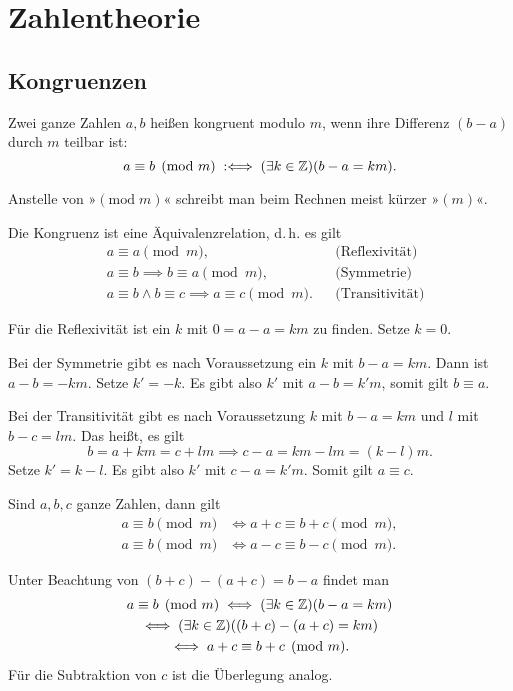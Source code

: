 
\chapter{Zahlentheorie}

\section{Kongruenzen}

\begin{Definition}[Kongruenz]
Zwei ganze Zahlen $a,b$ heißen kongruent modulo $m$, wenn ihre Differenz
$(b-a)$ durch $m$ teilbar ist:%
\[a\equiv b\pmod{m}\;:\Longleftrightarrow\; (\exists k\in\mathbb Z)(b-a=km).\]
\end{Definition}
Anstelle von »$(\mathrm{mod}\;m)$« schreibt man beim Rechnen meist
kürzer »$(m)$«.

\begin{Satz}
Die Kongruenz ist eine Äquivalenzrelation, d.\,h. es gilt
\begin{align*}
&a\equiv a\pmod{m},&&\text{(Reflexivität)}\\
&a\equiv b\implies b\equiv a\pmod{m},&&\text{(Symmetrie)}\\
&a\equiv b\land b\equiv c\implies a\equiv c\pmod{m}.&&\text{(Transitivität)}
\end{align*}
\end{Satz}
 Für die Reflexivität ist ein $k$ mit $0=a-a=km$
zu finden. Setze $k=0$.

Bei der Symmetrie gibt es nach Voraussetzung
ein $k$ mit $b-a=km$. Dann ist $a-b=-km$. Setze $k'=-k$.
Es gibt also $k'$ mit $a-b=k'm$, somit gilt $b\equiv a$.

Bei der Transitivität gibt es nach Voraussetzung $k$ mit
$b-a=km$ und $l$ mit $b-c=lm$. Das heißt, es gilt
\[b = a+km = c+lm\implies c-a = km-lm = (k-l)m.\]
Setze $k'=k-l$. Es gibt also $k'$ mit $c-a=k'm$.
Somit gilt $a\equiv c$.\;\qedsymbol

\begin{Satz}\label{Kongruenz-add-sub}
Sind $a,b,c$ ganze Zahlen, dann gilt
\begin{align*}
a\equiv b\pmod{m}&\iff a+c\equiv b+c\pmod{m},\\
a\equiv b\pmod{m}&\iff a-c\equiv b-c\pmod{m}.
\end{align*}
\end{Satz}
Unter Beachtung von $(b+c)-(a+c)=b-a$ findet man
\begin{gather*}
a\equiv b\pmod{m}
\iff (\exists k\in\mathbb Z)(b-a=km)\\
\iff (\exists k\in\mathbb Z)((b+c)-(a+c)=km)\\
\iff a+c\equiv b+c\pmod{m}.
\end{gather*}
Für die Subtraktion von $c$ ist die Überlegung analog.\;\qedsymbol

